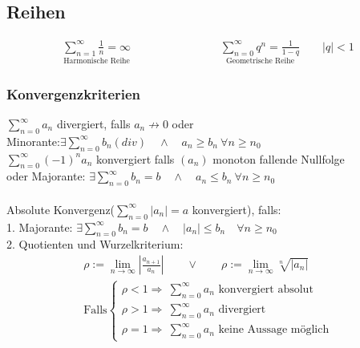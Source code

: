 \documentclass[6pt,a4paper]{scrartcl}
\newcommand{\abs}[1]{\ensuremath{\left\vert#1\right\vert}}
\newcommand{\Ra}[0]{\ensuremath{\Rightarrow}}
\begin{document}
\begin{multicols}{4}
\subsection{Reihen}
\begin{eqnarray*}
	\underset{\text{Harmonische Reihe}}{\sum_{n=1}^\infty \frac{1}{n} = \infty} \qquad \qquad  \qquad \qquad \underset{\text{Geometrische Reihe}}{\sum_{n=0}^\infty q^n = \frac{1}{1-q}} \qquad |q|<1
\end{eqnarray*}

\subsubsection{Konvergenzkriterien}
$\sum^{\infty}_{n = 0} a_n$ divergiert, falls $a_n \not \rightarrow 0$ oder\\
Minorante:$\exists \sum^{\infty}_{n = 0} b_n (div) \quad \land \quad a_n \ge b_n \ \forall n\ge n_0$\\[0.6em] 
$\sum^{\infty}_{n = 0}(-1)^n a_n$ konvergiert falls $(a_n)$ monoton fallende Nullfolge\\
oder Majorante: $\exists \sum^{\infty}_{n = 0} b_n = b \quad \land \quad a_n \le b_n \ \forall n\ge n_0$\\
\\
Absolute Konvergenz($\sum^\infty_{n=0} |a_n|=a$ konvergiert), falls:\\
1. Majorante: $\exists \sum^{\infty}_{n = 0} b_n = b \quad \land \quad |a_n| \le b_n \quad \forall n\ge n_0$\\
2. Quotienten und Wurzelkriterium:
\begin{eqnarray*}
	\rho := \lim_{n \rightarrow \infty} \abs{\frac{a_{n+1}}{a_n}} \qquad \lor \qquad \rho := \lim_{n \rightarrow \infty} \sqrt[n]{\abs{a_n}}\\
	\text{Falls} 
	\begin{cases}
		\rho < 1 \Ra  ~\sum^\infty_{n=0} a_n \text{ konvergiert absolut} \\
		\rho > 1 \Ra  ~\sum^\infty_{n=0} a_n \text{ divergiert} \\
		\rho = 1 \Ra ~ \sum^\infty_{n=0} a_n \text{ keine Aussage möglich}
	\end{cases}
\end{eqnarray*}





\end{multicols}
\end{document}
